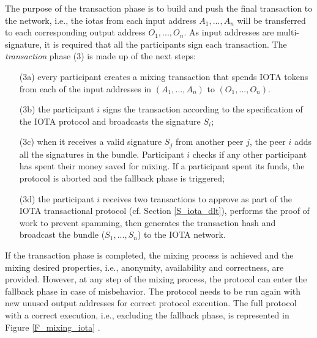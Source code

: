 The purpose of the transaction phase is to build and push the final transaction to the network, i.e., the iotas from each input address $A_{1},..., A_{n}$ 
will be transferred to each corresponding output address $O_{1},...,O_{n}$. As input addresses are multi-signature, it is required 
that all the participants sign each transaction. The \emph{transaction} phase (3) is made up of the next steps:
\begin{itemize}
  \item[(3a)] every participant creates a mixing transaction that spends IOTA tokens from each
  of the input addresses in $(A_{1},...,A_{n})$ to $( O_{1},...,O_{n})$.
  \item[(3b)] the participant $i$ signs the transaction according to the specification of the IOTA protocol and broadcasts the signature $S_{i}$;
  \item[(3c)] when it receives a valid signature $S_{j}$ from another peer $j$, the peer $i$ adds all the signatures in the bundle.
 Participant $i$ checks if any other participant has spent their money saved for mixing. 
 If a participant spent its funds, the protocol is aborted and the fallback phase is triggered;
 \item[(3d)] the participant $i$ receives two transactions to approve as part of the IOTA transactional protocol (cf. Section \ref{S_iota_dlt}),
 performs the proof of work to prevent spamming, then generates the transaction hash 
 and broadcast the bundle ($S_{1},...,S_{n}$) to the IOTA network.
\end{itemize} 

If the transaction phase is completed, the mixing process is achieved and the mixing desired properties, i.e., anonymity, availability and correctness, are provided.
However, at any step of the mixing process, the protocol can enter the fallback phase in case of misbehavior. 
The protocol needs to be run again with new unused output addresses for correct protocol execution. 
The full protocol with a correct execution, i.e., excluding the fallback phase, 
is represented in Figure \ref{F_mixing_iota} .

